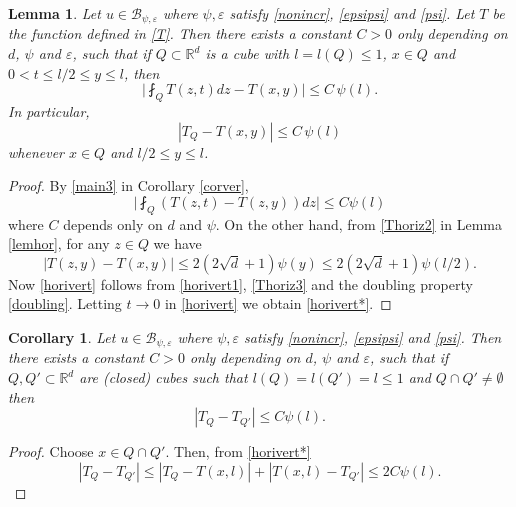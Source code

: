 \documentclass[11pt,letterpaper]{amsart}
\newtheorem{cor}{Corollary}[section]
\newtheorem{lem}{Lemma}[section]
\theoremstyle{definition}
\numberwithin{equation}{section}
\newcommand{\R}{\mathbb R}
\begin{document}
\begin{lem}\label{matlemcor}
Let $u\in  \mathcal{B}_{\psi , \varepsilon }$ where $\psi , \varepsilon$ satisfy \eqref{nonincr}, \eqref{epsipsi} and \eqref{psi}. Let $T$ be the function defined in \eqref{T}. Then there exists a constant $C>0$ only depending on $d$, $\psi$ and $\varepsilon$, such that if $Q  \subset \R^d $ is a cube with $l = l(Q) \leq 1$, $x\in Q$ and $0 < t \leq l/2 \leq   y \leq l  $, then
\begin{equation}\label{horivert}
\Big | \fint_{Q} T(z,t) dz - T(x,y) \Big | \leq C \, \psi (l). 
\end{equation}
In particular,
\begin{equation}\label{horivert*}
|T_Q - T(x,y) | \leq C \, \psi (l)
\end{equation}
whenever $x\in Q$ and $l/2 \leq y \leq l$.
\end{lem}

\begin{proof}

By \eqref{main3} in Corollary \ref{corver},
\begin{equation}\label{horivert1}
\Big |  \fint_{Q} ( T(z,t) - T(z,y) ) dz  \Big | \leq C \psi (l)
\end{equation}
where $C$  depends only on $d$ and $\psi$. On the other hand, from \eqref{Thoriz2} in Lemma \ref{lemhor}, for any $z \in Q$ we have 
\begin{equation}\label{Thoriz3}
|T(z,y) - T(x,y)| \leq 2(2\sqrt{d} +1) \psi (y) \leq 2(2\sqrt{d} +1) \psi (l/2) . 
\end{equation}
Now \eqref{horivert} follows from \eqref{horivert1}, \eqref{Thoriz3} and the doubling property \eqref{doubling}. Letting $t\to 0$ in \eqref{horivert} we obtain \eqref{horivert*}. 
\end{proof}


\begin{cor}\label{corTQ}
Let $u\in  \mathcal{B}_{\psi , \varepsilon }$ where $\psi , \varepsilon$ satisfy \eqref{nonincr}, \eqref{epsipsi} and \eqref{psi}. Then there exists a constant $C>0$ only depending on $d$, $\psi$ and $\varepsilon$, such that if $Q, Q' \subset \R^d$ are (closed) cubes such that $l(Q) = l(Q') = l \leq 1$ and $Q\cap Q' \neq \emptyset$ then
\begin{equation}\label{incrT}
|T_Q - T_{Q'}| \leq C \psi (l) . 
\end{equation}
\end{cor}

\begin{proof}
Choose $x \in Q \cap Q'$. Then, from \eqref{horivert*}
$$
|T_Q - T_{Q'}| \leq |T_Q - T(x,l)| + |T(x,l) - T_{Q'}| \leq 2 C \psi (l) . 
$$
\end{proof}
\end{document}
